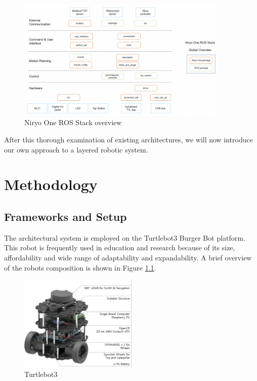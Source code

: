\documentclass[%
paper=A4,               %
twoside=true,           %
openright,              %
11pt,                   %
bibliography=totoc,     %
titlepage=on,           %
DIV=12,                 %
BCOR=1.5cm,             %
parskip=half,            %
final
]{scrreprt}
\begin{document}
	
	\begin{figure}[ht]
		\centering
		\includegraphics[width=0.9\textwidth]{Graphics/Niryo}
		\caption{Niryo One ROS Stack overview \autocite{roboticsNiryoOneROS2024}}
		\label{fig: fig6}
	\end{figure}
	
	After this thorough examination of existing architectures, we will now introduce our own approach to a layered robotic system. 
	
	
	\chapter{Methodology}
	\section{Frameworks and Setup}

	The architectural system is employed on the Turtlebot3 Burger Bot platform. This robot is frequently used in education and research because of its size, affordability and wide range of adaptability and expandability. A brief overview of the robots composition is shown in Figure \ref{fig: fig7}. 
		
	\begin{figure}[ht]
		\centering
		\includegraphics[width=0.5\textwidth]{Graphics/Turtlebot3}
		\caption{Turtlebot3}
		\label{fig: fig7}
	\end{figure}
		
\end{document}
